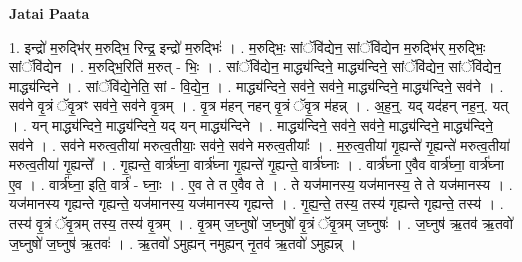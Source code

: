 \documentclass[17pt]{extarticle}
\begin{document}
\textbf{Jatai Paata} \newline

1. इन्द्रो॑ म॒रुद्भि॑र् म॒रुद्भि॒ रिन्द्र॒ इन्द्रो॑ म॒रुद्भिः॑ । . म॒रुद्भिः॒ सांॅवि॑द्येन॒ सांॅवि॑द्येन म॒रुद्भि॑र् म॒रुद्भिः॒ सांॅवि॑द्येन । . म॒रुद्भि॒रिति॑ म॒रुत् - भिः॒ । . सांॅवि॑द्येन॒ माद्ध्य॑न्दिने॒ माद्ध्य॑न्दिने॒ सांॅवि॑द्येन॒ सांॅवि॑द्येन॒ माद्ध्य॑न्दिने । . सांॅवि॑द्ये॒नेति॒ सां - वि॒द्ये॒न॒ । . माद्ध्य॑न्दिने॒ सव॑ने॒ सव॑ने॒ माद्ध्य॑न्दिने॒ माद्ध्य॑न्दिने॒ सव॑ने । . सव॑ने वृ॒त्रं ॅवृ॒त्रꣳ सव॑ने॒ सव॑ने वृ॒त्रम् । . वृ॒त्र म॑हन् नहन् वृ॒त्रं ॅवृ॒त्र म॑हन्न् । . अ॒ह॒न्॒. यद् यद॑हन् नह॒न्॒. यत् । . यन् माद्ध्य॑न्दिने॒ माद्ध्य॑न्दिने॒ यद् यन् माद्ध्य॑न्दिने । . माद्ध्य॑न्दिने॒ सव॑ने॒ सव॑ने॒ माद्ध्य॑न्दिने॒ माद्ध्य॑न्दिने॒ सव॑ने । . सव॑ने मरुत्व॒तीया॑ मरुत्व॒तीयाः॒ सव॑ने॒ सव॑ने मरुत्व॒तीयाः᳚ । . म॒रु॒त्व॒तीया॑ गृ॒ह्यन्ते॑ गृ॒ह्यन्ते॑ मरुत्व॒तीया॑ मरुत्व॒तीया॑ गृ॒ह्यन्ते᳚ । . गृ॒ह्यन्ते॒ वार्त्र॑घ्ना॒ वार्त्र॑घ्ना गृ॒ह्यन्ते॑ गृ॒ह्यन्ते॒ वार्त्र॑घ्नाः । . वार्त्र॑घ्ना ए॒वैव वार्त्र॑घ्ना॒ वार्त्र॑घ्ना ए॒व । . वार्त्र॑घ्ना॒ इति॒ वार्त्र॑ - घ्नाः॒ । . ए॒व ते त ए॒वैव ते । . ते यज॑मानस्य॒ यज॑मानस्य॒ ते ते यज॑मानस्य । . यज॑मानस्य गृह्यन्ते गृह्यन्ते॒ यज॑मानस्य॒ यज॑मानस्य गृह्यन्ते । . गृ॒ह्य॒न्ते॒ तस्य॒ तस्य॑ गृह्यन्ते गृह्यन्ते॒ तस्य॑ । . तस्य॑ वृ॒त्रं ॅवृ॒त्रम् तस्य॒ तस्य॑ वृ॒त्रम् । . वृ॒त्रम् ज॒घ्नुषो॑ ज॒घ्नुषो॑ वृ॒त्रं ॅवृ॒त्रम् ज॒घ्नुषः॑ । . ज॒घ्नुष॑ ऋ॒तव॑ ऋ॒तवो॑ ज॒घ्नुषो॑ ज॒घ्नुष॑ ऋ॒तवः॑ । . ऋ॒तवो॑ ऽमुह्यन् नमुह्यन् नृ॒तव॑ ऋ॒तवो॑ ऽमुह्यन्न् । \newline
\end{document}
